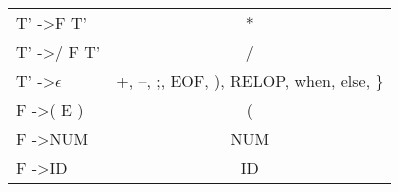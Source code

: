 \documentclass[12pt]{article}
\begin{document}
\begin{table}[]
\begin{tabular}{|l|c|}
    T' -\textgreater * F T'       & *                                      \\
    T' -\textgreater / F T'       & /                                      \\
    T' -\textgreater $\epsilon$            & +, –, ;, EOF, ), RELOP, when, else, \} \\
    F -\textgreater ( E )         & (                                      \\
    F -\textgreater NUM           & NUM                                    \\
    F -\textgreater ID            & ID                                    
    \end{tabular}
    \end{table}
    
\end{document}
